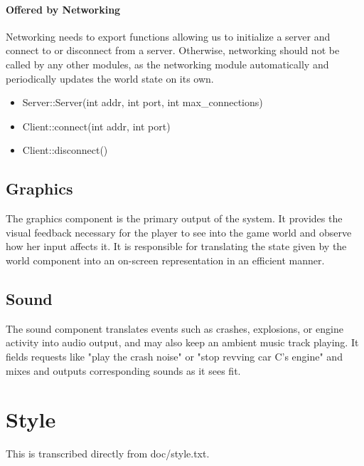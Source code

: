 \documentclass[12pt]{article}
\begin{document}
\paragraph{Offered by Networking}
Networking needs to export functions allowing us to initialize a server and connect to or disconnect from a server.  Otherwise, networking should not be called by any other modules, as the networking module automatically and periodically updates the world state on its own.
\begin{itemize}
\item Server::Server(int addr, int port, int max\_connections)
\item Client::connect(int addr, int port)
\item Client::disconnect()
\end{itemize}

\subsection{Graphics}
The graphics component is the primary output of the system. It provides the
visual feedback necessary for the player to see into the game world and observe
how her input affects it. It is responsible for translating the state given
by the world component into an on-screen representation in an efficient manner.
\subsection{Sound}
The sound component translates events such as crashes, explosions, or engine
activity into audio output, and may also keep an ambient music track playing.
It fields requests like "play the crash noise" or "stop revving car C's engine"
and mixes and outputs corresponding sounds as it sees fit.

\section{Style}
This is transcribed directly from doc/style.txt.


\end{document}

